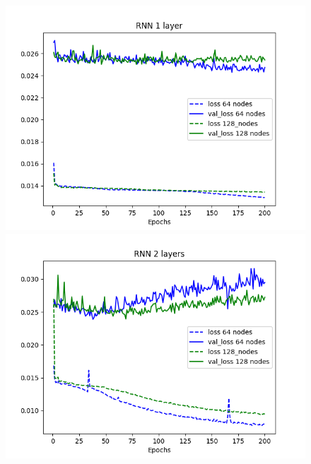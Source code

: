 \documentclass[11pt]
{article}
\begin{document}
\begin{figure}[H]
\begin{minipage}[b]{0.33\linewidth}
		\includegraphics[width=\linewidth]{../TESTS_RESULTS/RNN_tests/plots/1_comp.png} 
	\end{minipage}%
	\begin{minipage}[b]{0.33\linewidth}
		\centering
		\includegraphics[width=\linewidth]{../TESTS_RESULTS/RNN_tests/plots/2_comp.png} 
	\end{minipage} 
	\begin{minipage}[b]{0.33\linewidth}
		\centering

\end{minipage}
\end{figure}
\end{document}
